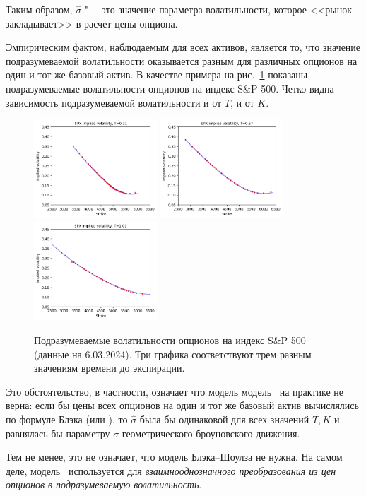 Таким образом, $\hat\sigma$ "--- это значение параметра волатильности, которое <<рынок закладывает>> в расчет цены опциона.

Эмпирическим фактом, наблюдаемым для всех активов, является то, что значение подразумеваемой волатильности оказывается разным для различных опционов на один и тот же базовый актив.
В качестве примера на рис.~\ref{11:f:iv} показаны подразумеваемые волатильности опционов на индекс S\&P 500.
Четко видна зависимость подразумеваемой волатильности и от $T$, и от $K$.

\begin{figure}[h]
\centering
\includegraphics[height=3.7cm]{pic/iv-3m.png}
\includegraphics[height=3.7cm]{pic/iv-6m.png}
\includegraphics[height=3.7cm]{pic/iv-1y.png}
\caption{Подразумеваемые волатильности опционов на индекс S\&P 500 (данные на 6.03.2024). Три графика соответствуют трем разным значениям времени до экспирации.}
\label{11:f:iv}
\end{figure}

Это обстоятельство, в частности, означает что модель модель \bs\ на практике не верна: если бы цены всех опционов на один и тот же базовый актив вычислялись по формуле Блэка (или \bs), то $\hat\sigma$ была бы одинаковой для всех значений $T,K$ и равнялась бы параметру $\sigma$ геометрического броуновского движения.

Тем не менее, это не означает, что модель Блэка--Шоулза не нужна.
На самом деле, модель \bs\ используется для \emph{взаимнооднозначного преобразования из цен опционов в подразумеваемую волатильность}.

